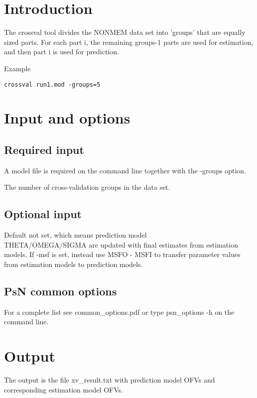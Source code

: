 

\usepackage{hyperref}



\maketitle
\newcommand{\guidetoolname}{crossval}
\tableofcontents
\newpage

\section{Introduction}

The crossval tool divides the NONMEM data set into 'groups' that are equally sized parts.
For each part i, the remaining groups-1 parts are used for estimation,
and then part i is used for prediction.

Example
\begin{verbatim}
crossval run1.mod -groups=5
\end{verbatim}

\section{Input and options}
	
\subsection{Required input}
A model file is required on the command line together with the -groups option.
\begin{optionlist}
The number of cross-validation groups in the data set.
\nextopt		
\end{optionlist}

\subsection{Optional input}
			
\begin{optionlist}
Default not set, which means prediction model\\
THETA/OMEGA/SIGMA are updated with final estimates from estimation models.
If -msf is set, instead use MSFO - MSFI to transfer parameter values from estimation models to prediction models.
\nextopt
\end{optionlist}

\subsection{PsN common options}
For a complete list see common\_options.pdf or type psn\_options -h on the command line.

\section{Output}

The output is the file xv\_result.txt with prediction model OFVs and corresponding estimation model OFVs.


